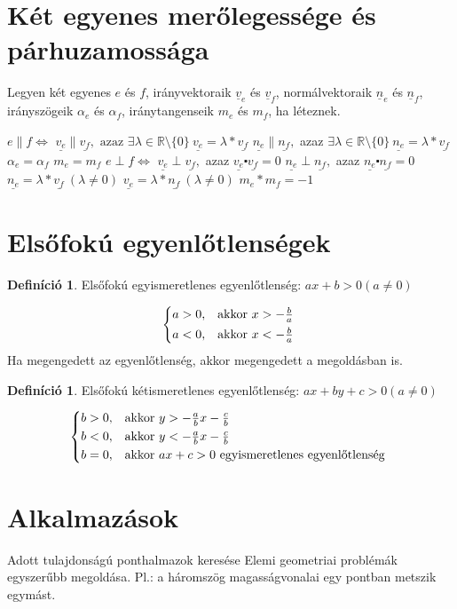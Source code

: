 \documentclass[twoside,12pt]{report}
\renewcommand{\vec}{\underline}
\theoremstyle{definition}
\newtheorem{definition}[theorem]{Definíció}
\begin{document}
\section{Két egyenes merőlegessége és párhuzamossága}
	Legyen két egyenes $e$ és $f$, irányvektoraik $\vec{v}_e$ és $\vec{v}_f$, normálvektoraik $\vec{n}_e$ és $\vec{n}_f$, irányszögeik $\alpha_e$ és $\alpha_f$, iránytangenseik $m_e$ és $m_f$, ha léteznek.
	\begin{outline}
		\1 $e\|f\Leftrightarrow$
			\2[] $\vec{v_e}\|\vec{v_f},\text{ azaz }\exists\lambda\in\mathbb{R}\setminus\{0\}\ \vec{v_e}=\lambda*\vec{v_f}$
			\2[] $\vec{n_e}\|\vec{n_f},$ azaz $\exists\lambda\in\mathbb{R}\setminus\{0\}\ \vec{n_e}=\lambda*\vec{v_f}$
			\2[] $\alpha_e=\alpha_f$
			\2[] $m_e=m_f$
		\1 $e\perp f\Leftrightarrow$
			\2[] $\vec{v_e}\perp \vec{v_f},$ azaz $\vec{v_e}\centerdot\vec{v_f}=0$
			\2[] $\vec{n_e}\perp \vec{n_f},$ azaz $\vec{n_e}\centerdot\vec{n_f}=0$
			\2[] $\vec{n_e}=\lambda*\vec{v_f}\ (\lambda\ne0)$
			\2[] $\vec{v_e}=\lambda*\vec{n_f}\ (\lambda\ne0)$
			\2[] $m_e*m_f=-1$
	\end{outline}
\section{Elsőfokú egyenlőtlenségek}
	\begin{definition}
		Elsőfokú egyismeretlenes egyenlőtlenség: $ax+b>0 (a\ne0)$
	\end{definition}
	\begin{equation*}
		\begin{cases*}
			a>0,& akkor $x>-\frac{b}{a}$\\
			a<0,& akkor $x<-\frac{b}{a}$
		\end{cases*}
	\end{equation*}
	Ha megengedett az egyenlőtlenség, akkor megengedett a megoldásban is.
	\begin{definition}
		Elsőfokú kétismeretlenes egyenlőtlenség: $ax+by+c>0 (a\ne0)$
	\end{definition}
	\begin{equation*}
		\begin{cases*}
			b>0,& akkor $y>-\frac{a}{b}x-\frac{c}{b}$\\
			b<0,& akkor $y<-\frac{a}{b}x-\frac{c}{b}$\\
			b=0,& akkor $ax+c>0$ egyismeretlenes egyenlőtlenség
		\end{cases*}
	\end{equation*}
\section{Alkalmazások}
	\begin{outline}
		\1 Adott tulajdonságú ponthalmazok keresése
		\1 Elemi geometriai problémák egyszerűbb megoldása. Pl.: a háromszög magasságvonalai egy pontban metszik egymást.
	\end{outline}
\end{document}
